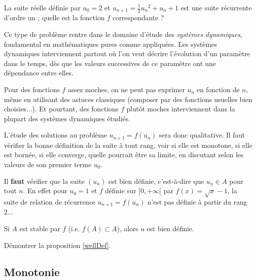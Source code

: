 \documentclass[../main.tex]{subfiles}
\begin{document}
\begin{exe}\label{réc1}
    La suite réelle définie par $u_0=2$ et $u_{n+1}=\frac{1}{2}{u_n}^2+u_n+1$ est une suite récurrente d'ordre un ; quelle est la fonction $f$ correspondante ?
\end{exe}

Ce type de problème rentre dans le domaine d'étude des \textit{systèmes dynamiques}, fondamental en mathématiques pures comme appliquées. Les systèmes dynamiques interviennent partout où l'on veut décrire l'évolution d'un paramètre dans le temps, dès que les valeurs successives de ce paramètre ont une dépendance entre elles.

Pour des fonctions $f$ assez moches, on ne peut pas exprimer $u_n$ en fonction de $n$, même en utilisant des astuces classiques (composer par des fonctions usuelles bien choisies...). Et pourtant, des fonctions $f$ plutôt moches interviennent dans la plupart des systèmes dynamiques étudiés.

L'étude des solutions au problème $u_{n+1}=f(u_n)$ sera donc qualitative. Il faut vérifier la bonne définition de la suite à tout rang, voir si elle est monotone, si elle est bornée, si elle converge, quelle pourrait être sa limite, en discutant selon les valeurs de son premier terme $u_0$.

\begin{rem}
    Il \textbf{faut} vérifier que la suite $(u_n)$ est bien définie, c'est-à-dire que $u_n\in A$ pour tout $n$. En effet pour $u_0=1$ et $f$ définie sur $[0,+\infty[$ par $f(x)=\sqrt{x}-1$, la suite de relation de récurrence $u_{n+1}=f(u_n)$ n'est pas définie à partir du rang 2...
\end{rem}

\begin{prop}\label{wellDef}
    Si $A$ est stable par $f$ (i.e. $f(A)\subset A$), alors $u$ est bien définie.
\end{prop}

\begin{exo}[M]
	Démontrer la proposition \ref{wellDef}.
\end{exo}

\subsection{Monotonie}
\end{document}

